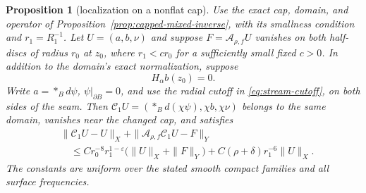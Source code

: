 \documentclass[11pt]{amsart}
\newtheorem{proposition}[theorem]{Proposition}
\theoremstyle{definition}
\theoremstyle{remark}
\theoremstyle{plain}
\begin{document}
\begin{proposition}[localization on a nonflat cap]
\label{prop:nonflat-cap-localization}
Use the exact cap, domain, and operator of
Proposition~\ref{prop:capped-mixed-inverse}, with its smallness
condition and $r_1=R_1^{-1}$. Let $U=(a,b,\nu)$ and suppose
$F=\mathcal A_{\rho,f}U$ vanishes on both
half-discs of radius $r_0$ at $z_0$, where $r_1<c r_0$ for a
sufficiently small fixed $c>0$. In addition to the domain's
exact normalization, suppose
\begin{equation}\label{eq:zero-harmonic-attaching}
                         H_\alpha b(z_0)=0.
\end{equation}
Write $a=*_Bd\psi$, $\psi|_{\partial B}=0$, and use the radial
cutoff in \eqref{eq:stream-cutoff}, on both sides of the seam.
Then $\mathcal C_1U=(*_Bd(\chi\psi),\chi b,\chi\nu)$ belongs
to the same domain, vanishes near the changed cap, and satisfies
\begin{equation}\label{eq:nonflat-cap-localization}
\begin{aligned}
 &\|\mathcal C_1U-U\|_X+
              \|\mathcal A_{\rho,f}\mathcal C_1U-F\|_Y\\
 &\quad\leq C r_0^{-8}r_1^{1-\varepsilon}
                         \bigl(\|U\|_X+\|F\|_Y\bigr)
          +C(\rho+\delta)r_1^{-6}\|U\|_X .
\end{aligned}
\end{equation}
The constants are uniform over the stated smooth compact families
and all surface frequencies.
\end{proposition}
\end{document}
